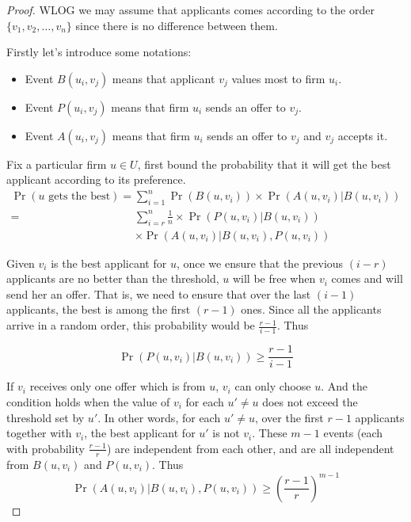 \begin{proof}

    WLOG we may assume that applicants comes according to the order $\{v_1, v_2, \dots, v_n\}$ since there is no difference between them.

    Firstly let's introduce some notations:

    \begin{itemize}
        \item Event $B(u_i, v_j)$ means that applicant $v_j$
            values most to firm $u_i$.
        \item Event $P(u_i, v_j)$ means that firm $u_i$ sends
            an offer to $v_j$.
        \item Event $A(u_i, v_j)$ means that firm $u_i$ sends
            an offer to $v_j$ and $v_j$ accepts it.
    \end{itemize}

    Fix a particular firm $u \in U$,
    first bound the probability that it will get the best applicant
    according to its preference.
    \begin{align*}
        \Pr(u\text{ gets the best}) = &\sum_{i=1}^{n} \Pr(B(u, v_i)) \times \Pr(A(u, v_i)|B(u, v_i)) \\
                                = &\sum_{i=r}^{n} \frac{1}{n} \times \Pr(P(u, v_i)|B(u, v_i)) \\
                        & \times \Pr(A(u, v_i)|B(u, v_i),P(u, v_i))
    \end{align*}
    
    Given $v_i$ is the best applicant for $u$,
    once we ensure that the previous $(i-r)$ applicants are
    no better than the threshold, $u$ will be free when $v_i$ comes and will
    send her an offer.
    That is, we need to ensure that over the last $(i-1)$ applicants,
    the best is among the first $(r-1)$ ones.
    Since all the applicants arrive in a random order, this probability would be $\frac{r-1}{i-1}$.
    Thus

    $$\Pr(P(u, v_i) | B(u, v_i)) \ge \frac{r-1}{i-1}$$



    If $v_i$ receives only one offer which is from $u$, $v_i$ can only choose $u$.
    And the condition holds when the value of $v_i$
    for each $u' \neq u$ does not exceed the threshold set by $u'$.
    In other words, for each $u' \neq u$, over the first $r-1$ applicants together with $v_i$,
    the best applicant for $u'$ is not $v_i$.
    These $m-1$ events (each with probability $\frac{r-1}{r}$) are independent from each other,
    and are all independent from $B(u, v_i)$ and $P(u, v_i)$.
    Thus
    $$\Pr(A(u, v_i)|B(u, v_i), P(u, v_i)) \ge (\frac{r-1}{r})^{m-1}$$


\end{proof}
